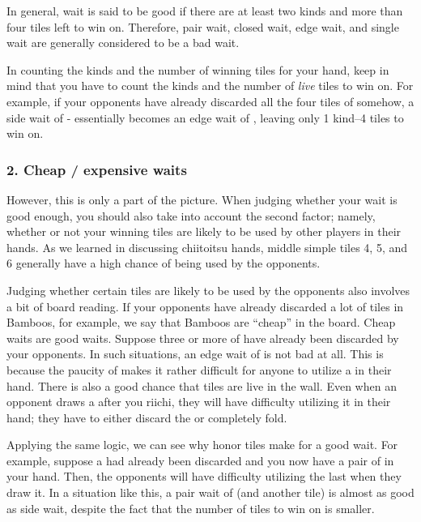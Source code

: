 \bigskip
In general, wait is said to be good if there are at least two kinds and more than four tiles left to win on. Therefore, pair wait, closed wait, edge wait, and single wait are generally considered to be a bad wait. 

\bigskip
In counting the kinds and the number of winning tiles for your hand, keep in mind that you have to count the kinds and the number of \emph{live} tiles to win on.
For example, if your opponents have already discarded all the four tiles of {\large {}} somehow, a side wait of {\large {}-} essentially becomes an edge wait of {\large{}}, leaving only 1 kind--4 tiles to win on.

\subsubsection{2. Cheap / expensive waits}
However, this is only a part of the picture. When judging whether your wait is good enough, you should also take into account the second factor; namely, whether or not your winning tiles are likely to be used by other players in their hands. As we learned in discussing {\jap chiitoitsu} hands, middle simple tiles 4, 5, and 6 generally have a high chance of being used by the opponents. 

\bigskip
Judging whether certain tiles are likely to be used by the opponents also involves a bit of board reading. If your opponents have already discarded a lot of tiles in Bamboos, for example, we say that Bamboos are ``cheap'' in the board. Cheap waits are good waits. Suppose three or more of {\large{}} have already been discarded by your opponents. In such situations, an edge wait of {\large {}} is not bad at all. This is because the paucity of {\large{}} makes it rather difficult for anyone to utilize a {\large{}} in their hand. There is also a good chance that {\large{}} tiles are live in the wall. Even when an opponent draws a {\large{}} after you {\jap riichi}, they will have difficulty utilizing it in their hand; they have to either discard the {\large{}} or completely fold. 

\bigskip
Applying the same logic, we can see why honor tiles make for a good wait. 
For example, suppose a {\large\zhong} had already been discarded and you now have a pair of {\large\zhong} in your hand. Then, the opponents will have difficulty utilizing the last {\large\zhong} when they draw it. In a situation like this, a pair wait of {\large\zhong} (and another tile) is almost as good as side wait, despite the fact that the number of tiles to win on is smaller. 

